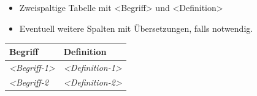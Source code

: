 \documentclass[]{article}
\begin{document}
\begin{itemize}
\item
  Zweispaltige Tabelle mit \textless{}Begriff\textgreater{} und
  \textless{}Definition\textgreater{}
\item
  Eventuell weitere Spalten mit Übersetzungen, falls notwendig.
\end{itemize}

\begin{longtable}[]{@{}ll@{}}
\toprule
\begin{minipage}[b]{0.31\columnwidth}\raggedright\strut
Begriff\strut
\end{minipage} & \begin{minipage}[b]{0.63\columnwidth}\raggedright\strut
Definition\strut
\end{minipage}\tabularnewline
\midrule
\endhead
\begin{minipage}[t]{0.31\columnwidth}\raggedright\strut
\emph{\textless{}Begriff-1\textgreater{}}\strut
\end{minipage} & \begin{minipage}[t]{0.63\columnwidth}\raggedright\strut
\emph{\textless{}Definition-1\textgreater{}}\strut
\end{minipage}\tabularnewline
\begin{minipage}[t]{0.31\columnwidth}\raggedright\strut
\emph{\textless{}Begriff-2}\strut
\end{minipage} & \begin{minipage}[t]{0.63\columnwidth}\raggedright\strut
\emph{\textless{}Definition-2\textgreater{}}\strut
\end{minipage}\tabularnewline
\bottomrule
\end{longtable}
\end{document}
